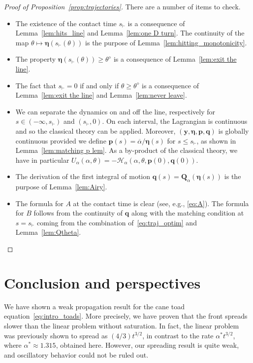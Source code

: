 \documentclass[10pt]{amsart}
\theoremstyle{definition}\newtheorem{defi}[theo]{Definition}\newtheorem{rema}[theo]{Remark}\newtheorem{exam}[theo]{Example}\newtheorem{exem}[theo]{Example}\newtheorem{nota}[theo]{Notation}
\newcommand{\bp}{\mathbf{p}}
\newcommand{\bq}{\mathbf{q}}
\newcommand{\bQ}{\mathbf{Q}}
\newcommand{\by}{\mathbf{y}}
\newcommand{\bH}{\mathscr{H}}
\newcommand{\beeta}{\boldsymbol{\eta}}
\newcommand{\1}{\mathds{1}}
\newcommand{\sh}{s_{\vdash}}
\newcommand{\Thetastar}{\theta^{\diamond}}
\newcommand{\shh}{s_{\vdash}}
\begin{document}
\begin{proof}[Proof of Proposition~\ref{prop:trajectories}]
There are a number of items to check.
\begin{itemize}
\item[\eqref{item:sh}] The existence of the contact time $\shh$ is a consequence of Lemma~\ref{lem:hits_line} and Lemma~\ref{lem:one D turn}. The continuity of the map $\theta\mapsto \beeta\left (\shh(\theta)\right)$ is the purpose of Lemma~\ref{lem:hitting_monotonicity}.
\item[\eqref{item:Q}] The property $\beeta(\shh(\theta)) \geq \Thetastar$ is a consequence of Lemma~\ref{lem:exit the line}.
\item[\eqref{item:sh=0}] The fact that $\shh = 0$ if and only if $\theta \geq \Thetastar$ is a consequence of Lemma~\ref{lem:exit the line} and Lemma~\ref{lem:never leave}.
\item[\eqref{item:continuous}] We can separate the dynamics on and off the line, respectively for $s\in (-\infty,\shh)$ and $(\shh,0)$. On each interval, the Lagrangian is continuous and so the classical theory can be applied. Moreover, $(\by,\beeta,\bp,\bq)$ is globally continuous provided we define $\bp(s) =\overline{\alpha}/\beeta(s) $ for $s\leq \shh$, as shown in Lemma~\ref{lem:matching p lem}. As a by-product of the classical theory, we have in particular $U_\alpha(\alpha,\theta) = - \bH_\alpha(\alpha,\theta,\bp(0),\bq(0))$.
\item[\eqref{item:after sh}] The derivation of the first integral of motion $\bq(s) = \bQ_\alpha(\beeta(s))$ is the purpose of Lemma~\ref{lem:Airy}.
\item[\eqref{item:A,B}] The formula for $A$ at the contact time is clear (see, e.g., \eqref{eq:A}). The formula for $B$ follows from the continuity of $\bq$ along with the matching condition at $s=\sh$ coming from the combination of~\eqref{eq:traj_optim} and Lemma~\ref{lem:Qtheta}.\qedhere
\end{itemize}
\end{proof}\let\qed\relax


\section{Conclusion and perspectives}

We have shown a weak propagation result for the cane toad equation~\eqref{eq:intro_toads}. More precisely, we have proven that the front spreads slower than the linear problem without saturation. In fact, the linear problem was previously shown to spread as $(4/3) t^{3/2}$, in contrast to the rate $\alpha^* t^{3/2}$, where $\alpha^* \approx 1.315$, obtained here. However, our spreading result is quite weak, and oscillatory behavior could not be ruled out.
\end{document}
